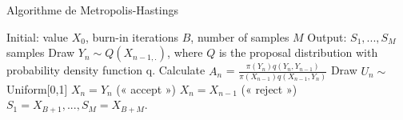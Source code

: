 \begin{algorithm}
	\caption{Algorithme de Metropolis-Hastings \cite{entezari2018bayesian}}
	\label{m-c_algo}
	\begin{algorithmic}[1]
		\State Initial: value $X_{0}$, burn-in iterations $B$, number of samples $M$
		\State Output: $S_{1},...,S_{M}$ samples
			\State Draw $Y_{n}\sim Q(X_{n-1,.}) $, where $Q$ is the proposal distribution with probability density function q.
			\State Calculate $A_{n}$ = $\frac{\pi(Y_{n})q(Y_{n},Y_{n-1})}{\pi(X_{n-1})q(X_{n-1},Y_{n})}$
			\State Draw $U_{n} \sim $ Uniform[0,1]
				\State $X_{n} = Y_{n}$ (« accept »)
			\Else
				\State $X_{n} = X_{n-1}$ (« reject »)
			\EndIf
		\EndFor
		\State \Return $S_{1} = X_{B+1},...,S_{M} = X_{B+M}$.
	\end{algorithmic}
\end{algorithm}

